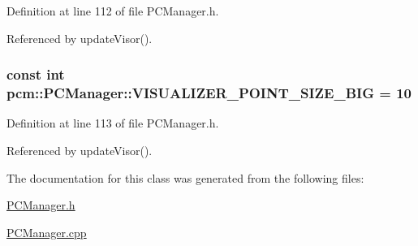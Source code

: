 Definition at line 112 of file P\-C\-Manager.\-h.



Referenced by update\-Visor().

\hypertarget{classpcm_1_1PCManager_a53820f1bdb5fc94830c0a04334916d12}{
\subsubsection[{V\-I\-S\-U\-A\-L\-I\-Z\-E\-R\-\_\-\-P\-O\-I\-N\-T\-\_\-\-S\-I\-Z\-E\-\_\-\-B\-I\-G}]{\setlength{\rightskip}{0pt plus 5cm}const int pcm\-::\-P\-C\-Manager\-::\-V\-I\-S\-U\-A\-L\-I\-Z\-E\-R\-\_\-\-P\-O\-I\-N\-T\-\_\-\-S\-I\-Z\-E\-\_\-\-B\-I\-G = 10\hspace{0.3cm}{\ttfamily [static]}}}\label{classpcm_1_1PCManager_a53820f1bdb5fc94830c0a04334916d12}


Definition at line 113 of file P\-C\-Manager.\-h.



Referenced by update\-Visor().



The documentation for this class was generated from the following files\-:\begin{DoxyCompactItemize}
\item 
\hyperlink{PCManager_8h}{P\-C\-Manager.\-h}\item 
\hyperlink{PCManager_8cpp}{P\-C\-Manager.\-cpp}\end{DoxyCompactItemize}
